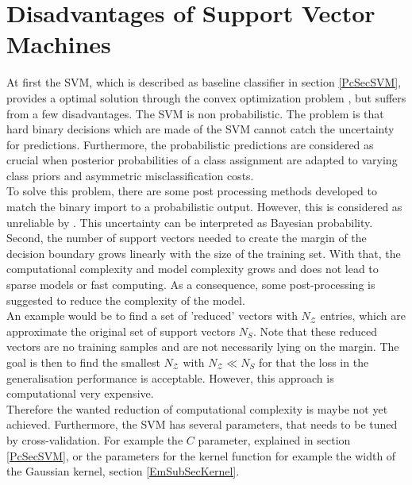 \section{Disadvantages of Support Vector Machines}\label{PcSecIdea}
At first the \acs{SVM}, which is described as baseline classifier in section \ref{PcSecSVM}, provides a optimal solution through the convex optimization problem \cite[p. 325]{Bishop.2009}, but suffers from a few disadvantages.\newline
The \acs{SVM} is non probabilistic.
The problem is that hard binary decisions which are made of the \acs{SVM} cannot catch the uncertainty for predictions.
Furthermore, the probabilistic predictions are considered as crucial when posterior probabilities of a class assignment are adapted to varying class priors and asymmetric misclassification costs.\cite[p. 239-240]{Tipping.2001}\\
To solve this problem, there are some post processing methods developed to match the binary import to a probabilistic output.
However, this is considered as unreliable by \cite[p. 239-240]{Tipping.2001}. 
This uncertainty can be interpreted as Bayesian probability.\cite[p. 21]{Bishop.2009}\newline 
Second, the number of support vectors needed to create the margin of the decision boundary grows linearly with the size of the training set.
With that, the computational complexity and model complexity grows and does not lead to sparse models or fast computing.
As a consequence, some post-processing is suggested to reduce the complexity of the model.\cite{Chen.2009}\\
An example would be to find a set of 'reduced' vectors with $N_\mathcal{Z}$ entries, which are approximate the original set of support vectors $N_S$.
Note that these reduced vectors are no training samples and are not necessarily lying on the margin.
The goal is then to find the smallest $N_\mathcal{Z}$ with $N_\mathcal{Z} \ll N_S$ for that the loss in the generalisation performance is acceptable.
However, this approach is computational very expensive.\cite{Burges.1997}\\
Therefore the wanted reduction of computational complexity is maybe not yet achieved.\newline
Furthermore, the \ac{SVM} has several parameters, that needs to be tuned by cross-validation.
For example the $C$ parameter, explained in section \ref{PcSecSVM}, or the parameters for the kernel function for example the width of the Gaussian kernel, section \ref{EmSubSecKernel}.
